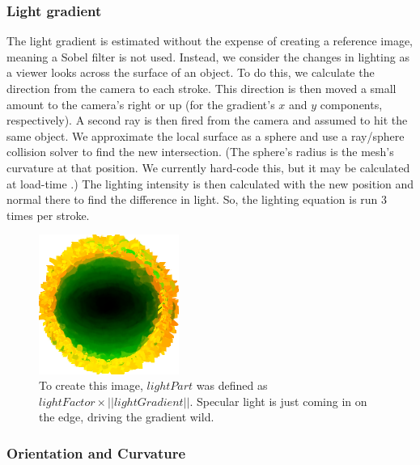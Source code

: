 \documentclass[conference]{acmsiggraph}
\begin{document}
\subsubsection{Light gradient}

The light gradient is estimated without the expense of creating a reference
image, meaning a Sobel filter is not used. Instead, we consider the changes in
lighting as a viewer looks across the surface of an object. To do this, we
calculate the direction from the camera to each stroke. This direction is then
moved a small amount to the camera's right or up (for the gradient's $x$ and
$y$ components, respectively). A second ray is then fired from the camera and
assumed to hit the same object. We approximate the local surface as a sphere
and use a ray/sphere collision solver to find the new intersection.
(The sphere's radius is the mesh's curvature at that position. We currently
hard-code this, but it may be calculated at load-time
\cite{gatzke2006estimating}.) The lighting intensity is then calculated with
the new position and normal there to find the difference in light. So, the
lighting equation is run 3 times per stroke.

\begin{figure}
  \centering
  \includegraphics[width=1.8in]{images/betterLightPartWild}
  \caption{To create this image, $lightPart$ was defined as
           $lightFactor \times ||lightGradient||$. Specular light is just
           coming in on the edge, driving the gradient wild.}
\end{figure}


\subsubsection{Orientation and Curvature}
\end{document}
